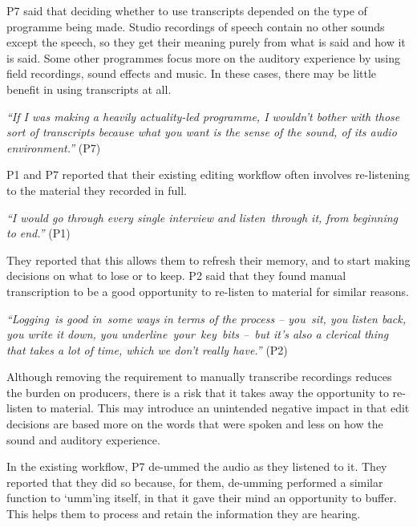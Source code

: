 P7 said that deciding whether to use transcripts depended on the type of programme being made. Studio recordings of
speech contain no other sounds except the speech, so they get their meaning purely from what is said and how it is
said. Some other programmes focus more on the auditory experience by using field recordings, sound effects and music.
In these cases, there may be little benefit in using transcripts at all.

\textit{``If I was making a heavily actuality-led programme, I wouldn't bother with those sort of transcripts because
what you want is the sense of the sound, of its audio environment.''} (P7)




P1 and P7 reported that their existing editing workflow often involves re-listening to the material they recorded in
full.

\textit{``I would go through every single interview and listen through it, from beginning to end.''} (P1)

They reported that this allows them to refresh their memory, and to start making decisions on what to lose or to keep.
P2 said that they found manual transcription to be a good opportunity to re-listen to material for similar
reasons.

\textit{``Logging is good in some ways in terms of the process -- you sit, you listen back, you write it down, you
underline your key bits -- but it's also a clerical thing that takes a lot of time, which we don't really have.''} (P2)

Although removing the requirement to manually transcribe recordings reduces the burden on producers, there is a risk
that it takes away the opportunity to re-listen to material. This may introduce an unintended negative impact in that
edit decisions are based more on the words that were spoken and less on how the sound and auditory experience.


In the existing workflow, P7 de-ummed the audio as they listened to it. They reported that they did so because, for
them, de-umming performed a similar function to `umm'ing itself, in that it gave their mind an opportunity to buffer.
This helps them to process and retain the information they are hearing.

